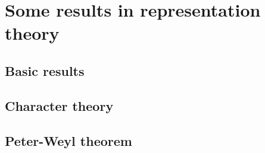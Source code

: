 \chapter{Some results in representation theory}
\label{chap:some_results_in_representation_theory}

\section{Basic results}
\label{sec:basic_results}

\section{Character theory}
\label{sec:character_theory}

\section{Peter-Weyl theorem}
\label{sec:peter_weyl_theorem}


